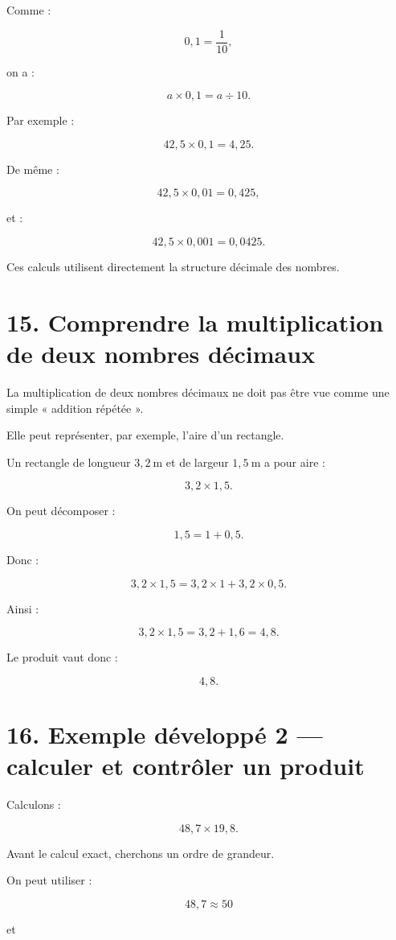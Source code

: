 Comme :

\[
0{,}1=\dfrac{1}{10},
\]

on a :

\[
a\times0{,}1=a\div10.
\]

Par exemple :

\[
42{,}5\times0{,}1=4{,}25.
\]

De même :

\[
42{,}5\times0{,}01=0{,}425,
\]

et :

\[
42{,}5\times0{,}001=0{,}0425.
\]

Ces calculs utilisent directement la structure décimale des nombres.

\section{15. Comprendre la multiplication de deux nombres décimaux}

La multiplication de deux nombres décimaux ne doit pas être vue comme une simple « addition répétée ».

Elle peut représenter, par exemple, l’aire d’un rectangle.

Un rectangle de longueur $3{,}2\ \text{m}$ et de largeur $1{,}5\ \text{m}$ a pour aire :

\[
3{,}2\times1{,}5.
\]

On peut décomposer :

\[
1{,}5=1+0{,}5.
\]

Donc :

\[
3{,}2\times1{,}5
=
3{,}2\times1
+
3{,}2\times0{,}5.
\]

Ainsi :

\[
3{,}2\times1{,}5
=
3{,}2+1{,}6
=
4{,}8.
\]

Le produit vaut donc :

\[
\boxed{4{,}8}.
\]

\section{16. Exemple développé 2 — calculer et contrôler un produit}

Calculons :

\[
48{,}7\times19{,}8.
\]

Avant le calcul exact, cherchons un ordre de grandeur.

On peut utiliser :

\[
48{,}7\approx50
\]

et

